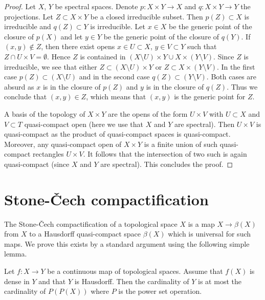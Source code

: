 \begin{proof}
Let $X$, $Y$ be spectral spaces. Denote $p : X \times Y \to X$ and
$q : X \times Y \to Y$ the projections. Let $Z \subset X \times Y$ be a
closed irreducible subset. Then $p(Z) \subset X$ is irreducible
and $q(Z) \subset Y$ is irreducible. Let $x \in X$ be the generic
point of the closure of $p(X)$ and let $y \in Y$ be the generic
point of the closure of $q(Y)$. If $(x, y) \not \in Z$, then
there exist opens $x \in U \subset X$, $y \in V \subset Y$ such
that $Z \cap U \times V = \emptyset$. Hence $Z$ is contained
in $(X \setminus U) \times Y \cup X \times (Y \setminus V)$.
Since $Z$ is irreducible, we see that either
$Z \subset (X \setminus U) \times Y$ or $Z \subset X \times (Y \setminus V)$.
In the first case $p(Z) \subset (X \setminus U)$ and in the
second case $q(Z) \subset (Y \setminus V)$. Both cases are absurd
as $x$ is in the closure of $p(Z)$ and $y$ is in the closure of
$q(Z)$. Thus we conclude that $(x, y) \in Z$, which means that
$(x, y)$ is the generic point for $Z$.

\medskip\noindent
A basis of the topology of $X \times Y$ are the opens of the form
$U \times V$ with $U \subset X$ and $V \subset T$ quasi-compact open
(here we use that $X$ and $Y$ are spectral). Then $U \times V$ is
quasi-compact as the product of quasi-compact spaces is quasi-compact.
Moreover, any quasi-compact open of $X \times Y$ is a finite union
of such quasi-compact rectangles $U \times V$. It follows that
the intersection of two such is again quasi-compact
(since $X$ and $Y$ are spectral). This concludes the proof.
\end{proof}











\section{Stone-{\v C}ech compactification}
\label{section-stone-cech}

\noindent
The Stone-{\v C}ech compactification of a topological space $X$
is a map $X \to \beta(X)$ from $X$ to a Hausdorff quasi-compact space
$\beta(X)$ which is universal for such maps. We prove this exists
by a standard argument using the following simple lemma.

\begin{lemma}
\label{lemma-dense-image}
Let $f : X \to Y$ be a continuous map of topological spaces. Assume that
$f(X)$ is dense in $Y$ and that $Y$ is Hausdorff. Then the cardinality
of $Y$ is at most the cardinality of $P(P(X))$ where $P$ is the power
set operation.
\end{lemma}

